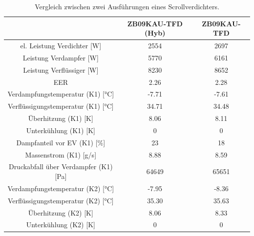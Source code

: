\begin{table}[h!]
\centering
\caption{Vergleich zwischen zwei Ausführungen eines Scrollverdichters.}
\label{tab:VergleichVerdichter}
\begin{tabular}{|ccc|}
\hline

                                                                & ZB09KAU-TFD (Hyb) & ZB09KAU-TFD \\ \hline
\multicolumn{1}{|c|}{el. Leistung Verdichter {[}W{]}}           & \multicolumn{1}{c|}{2554}  & 2697         \\
\multicolumn{1}{|c|}{Leistung Verdampfer {[}W{]}}               & \multicolumn{1}{c|}{5770}  & 6161         \\
\multicolumn{1}{|c|}{Leistung Verflüssiger {[}W{]}}             & \multicolumn{1}{c|}{8230}  & 8652         \\
\multicolumn{1}{|c|}{EER}                                       & \multicolumn{1}{c|}{2.26}  & 2.28         \\ \hline
\multicolumn{1}{|c|}{Verdampfungstemperatur (K1) {[}°C{]}}      & \multicolumn{1}{c|}{-7.71} & -7.61        \\
\multicolumn{1}{|c|}{Verflüssigungstemperatur (K1) {[}°C{]}}    & \multicolumn{1}{c|}{34.71} & 34.48        \\
\multicolumn{1}{|c|}{Überhitzung (K1) {[}K{]}}                  & \multicolumn{1}{c|}{8.06}  & 8.11         \\
\multicolumn{1}{|c|}{Unterkühlung (K1) {[}K{]}}                 & \multicolumn{1}{c|}{0}     & 0            \\
\multicolumn{1}{|c|}{Dampfanteil vor EV (K1) {[}\%{]}}          & \multicolumn{1}{c|}{23}    & 18           \\
\multicolumn{1}{|c|}{Massenstrom (K1) {[}g/s{]}}                & \multicolumn{1}{c|}{8.88}  & 8.59         \\
\multicolumn{1}{|c|}{Druckabfall über Verdampfer (K1) {[}Pa{]}} & \multicolumn{1}{c|}{64649} & 65651        \\ \hline
\multicolumn{1}{|c|}{Verdampfungstemperatur (K2) {[}°C{]}}      & \multicolumn{1}{c|}{-7.95} & -8.36        \\
\multicolumn{1}{|c|}{Verflüssigungstemperatur (K2) {[}°C{]}}    & \multicolumn{1}{c|}{35.30} & 35.63        \\
\multicolumn{1}{|c|}{Überhitzung (K2) {[}K{]}}                  & \multicolumn{1}{c|}{8.06}  & 8.33         \\
\multicolumn{1}{|c|}{Unterkühlung (K2) {[}K{]}}                 & \multicolumn{1}{c|}{0}     & 0            \\

\end{tabular}
\end{table}
